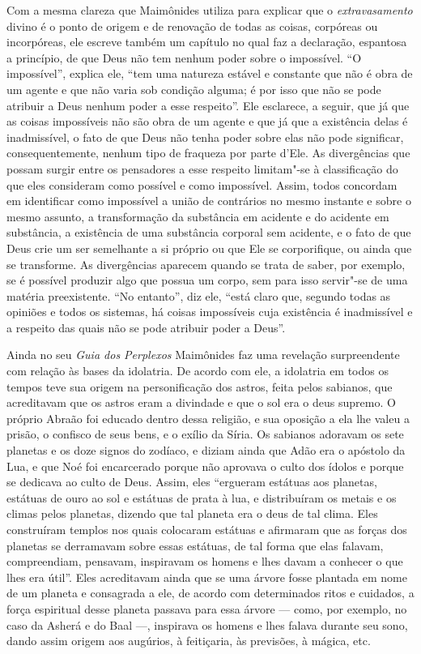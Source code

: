 Com a mesma clareza que Maimônides utiliza para explicar que o
\emph{extravasamento} divino é o ponto de origem e de renovação de todas
as coisas, corpóreas ou incorpóreas, ele escreve também um capítulo no
qual faz a declaração, espantosa a princípio, de que Deus não tem nenhum poder sobre
o impossível. ``O impossível'', explica ele, ``tem uma natureza estável
e constante que não é obra de um agente e que não varia sob condição
alguma; é por isso que não se pode atribuir a Deus nenhum poder a esse
respeito''. Ele esclarece, a seguir, que já que as coisas impossíveis
não são obra de um agente e que já que a existência delas é
inadmissível, o fato de que Deus não tenha poder sobre elas não pode
significar, consequentemente, nenhum tipo de fraqueza por parte d'Ele.
As divergências que possam surgir entre os pensadores a esse respeito
limitam"-se à classificação do que eles consideram como possível e como
impossível. Assim, todos concordam em identificar como impossível a
união de contrários no mesmo instante e sobre o mesmo assunto, a
transformação da substância em acidente e do acidente em substância, a
existência de uma substância corporal sem acidente, e o fato de que Deus
crie um ser semelhante a si próprio ou que Ele se corporifique, ou
ainda que se transforme. As divergências aparecem quando se trata de
saber, por exemplo, se é possível produzir algo que possua um corpo,
sem para isso servir"-se de uma matéria preexistente. ``No entanto'',
diz ele, ``está claro que, segundo todas as opiniões e todos os
sistemas, há coisas impossíveis cuja existência é inadmissível e a
respeito das quais não se pode atribuir poder a Deus''.

Ainda no seu \emph{Guia dos Perplexos} Maimônides faz uma revelação
surpreendente com relação às bases da idolatria. De acordo com ele, a
idolatria em todos os tempos teve sua origem na personificação dos
astros, feita pelos sabianos, que acreditavam que os astros eram a
divindade e que o sol era o deus supremo. O próprio Abraão foi educado
dentro dessa religião, e sua oposição a ela lhe valeu a prisão, o
confisco de seus bens, e o exílio da Síria. Os sabianos adoravam os sete
planetas e os doze signos do zodíaco, e diziam ainda que Adão era o
apóstolo da Lua, e que Noé foi encarcerado porque não aprovava o culto
dos ídolos e porque se dedicava ao culto de Deus. Assim, eles
``ergueram estátuas aos planetas, estátuas de ouro ao sol e estátuas de
prata à lua, e distribuíram os metais e os climas pelos planetas,
dizendo que tal planeta era o deus de tal clima. Eles construíram
templos nos quais colocaram estátuas e afirmaram que as forças dos
planetas se derramavam sobre essas estátuas, de tal forma que elas
falavam, compreendiam, pensavam, inspiravam os homens e lhes davam a
conhecer o que lhes era útil''. Eles acreditavam ainda que se uma árvore
fosse plantada em nome de um planeta e consagrada a ele, de acordo com
determinados ritos e cuidados, a força espiritual desse planeta passava
para essa árvore --- como, por exemplo, no caso da Asherá e do Baal ---,
inspirava os homens e lhes falava durante seu sono, dando assim origem
aos augúrios, à feitiçaria, às previsões, à mágica, etc.

